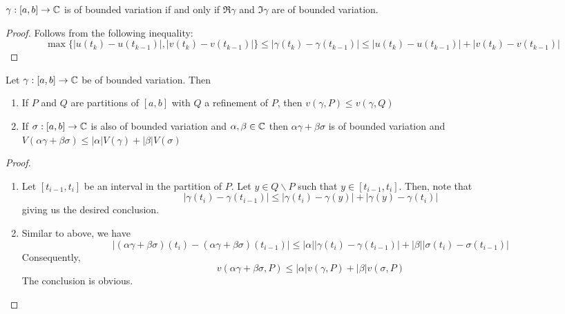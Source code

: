\begin{proposition}
    $\gamma:[a,b]\to\mathbb{C}$ is of bounded variation if and only if $\Re\gamma$ and $\Im\gamma$ are of bounded variation.
\end{proposition}
\begin{proof}
    Follows from the following inequality: 
    \begin{equation*}
        \max\{|u(t_k) - u(t_{k - 1})|, |v(t_k) - v(t_{k - 1})|\}\le|\gamma(t_k) - \gamma(t_{k - 1})|\le|u(t_k) - u(t_{k - 1})| + |v(t_k) - v(t_{k - 1})|
    \end{equation*}
\end{proof}

\begin{proposition}
    Let $\gamma:[a,b]\to\mathbb{C}$ be of bounded variation. Then 
    \begin{enumerate}[label=(\alph*)]
        \item If $P$ and $Q$ are partitions of $[a,b]$ with $Q$ a refinement of $P$, then $v(\gamma, P)\le v(\gamma, Q)$

        \item If $\sigma: [a,b]\to\mathbb{C}$ is also of bounded variation and $\alpha,\beta\in\mathbb{C}$ then $\alpha\gamma + \beta\sigma$ is of bounded variation and $V(\alpha\gamma + \beta\sigma)\le |\alpha|V(\gamma) + |\beta|V(\sigma)$
    \end{enumerate}
\end{proposition}
\begin{proof}
\hfill 
\begin{enumerate}
    \item Let $[t_{i - 1}, t_i]$ be an interval in the partition of $P$. Let $y\in Q\backslash P$ such that $y\in [t_{i - 1}, t_i]$. Then, note that 
    \begin{equation*}
        |\gamma(t_i) - \gamma(t_{i - 1})|\le|\gamma(t_i) - \gamma(y)| + |\gamma(y) - \gamma(t_i)|
    \end{equation*}
    giving us the desired conclusion.

    \item Similar to above, we have 
    \begin{equation*}
        |(\alpha\gamma + \beta\sigma)(t_i) - (\alpha\gamma + \beta\sigma)(t_{i - 1})|\le |\alpha||\gamma(t_i) - \gamma(t_{i - 1})| + |\beta||\sigma(t_i) - \sigma(t_{i - 1})|
    \end{equation*}
    Consequently, 
    \begin{equation*}
        v(\alpha\gamma + \beta\sigma, P)\le|\alpha|v(\gamma, P) + |\beta|v(\sigma, P)
    \end{equation*}
    The conclusion is obvious.
\end{enumerate}
\end{proof}

